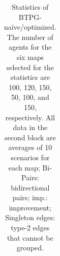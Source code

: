 \documentclass[letterpaper]{article} %
\theoremstyle{definition}
\begin{document}
\begin{table}[th!]
{\begin{tabular}{|c|c|c|c|c|c|c|c|c|c|c|c|c|}
    \end{tabular}}

   \caption{Statistics of BTPG-naïve/optimized. The number of agents for the six maps selected for the statistics are 100, 120, 150, 50, 100, and 150, respectively. All data in the second block are averages of 10 scenarios for each map; Bi-Pairs: bidirectional pairs; imp.: improvement; Singleton edges: type-2 edges that cannot be grouped. %
   }
   \label{tab:Statistics of BTPG-naive}
 \end{table}
\end{document}
